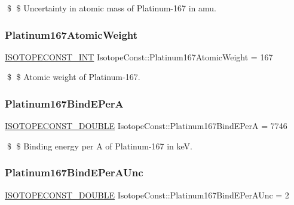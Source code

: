 \$ \$ Uncertainty in atomic mass of Platinum-\/167 in amu. \mbox{\label{group___isotope_const-_platinum-_pt167_gaa36b0203987f8f80010d64bc90168545}} 
\subsubsection{\texorpdfstring{Platinum167\+Atomic\+Weight}{Platinum167AtomicWeight}}
{\footnotesize\ttfamily \mbox{\hyperlink{group___isotope_const-_macros_ga5f18360b3e99483a35c32d789e62621c}{I\+S\+O\+T\+O\+P\+E\+C\+O\+N\+S\+T\+\_\+\+I\+NT}} Isotope\+Const\+::\+Platinum167\+Atomic\+Weight = 167}

\$ \$ Atomic weight of Platinum-\/167. \mbox{\label{group___isotope_const-_platinum-_pt167_ga9e5e290c69cb5cb7831a600be8bffd0e}} 
\subsubsection{\texorpdfstring{Platinum167\+Bind\+E\+PerA}{Platinum167BindEPerA}}
{\footnotesize\ttfamily \mbox{\hyperlink{group___isotope_const-_macros_ga8f45a7272ce02c0b4c65c44636ed719a}{I\+S\+O\+T\+O\+P\+E\+C\+O\+N\+S\+T\+\_\+\+D\+O\+U\+B\+LE}} Isotope\+Const\+::\+Platinum167\+Bind\+E\+PerA = 7746}

\$ \$ Binding energy per A of Platinum-\/167 in keV. \mbox{\label{group___isotope_const-_platinum-_pt167_ga5e6648f327a847488be7d1fa79ae118d}} 
\subsubsection{\texorpdfstring{Platinum167\+Bind\+E\+Per\+A\+Unc}{Platinum167BindEPerAUnc}}
{\footnotesize\ttfamily \mbox{\hyperlink{group___isotope_const-_macros_ga8f45a7272ce02c0b4c65c44636ed719a}{I\+S\+O\+T\+O\+P\+E\+C\+O\+N\+S\+T\+\_\+\+D\+O\+U\+B\+LE}} Isotope\+Const\+::\+Platinum167\+Bind\+E\+Per\+A\+Unc = 2}

